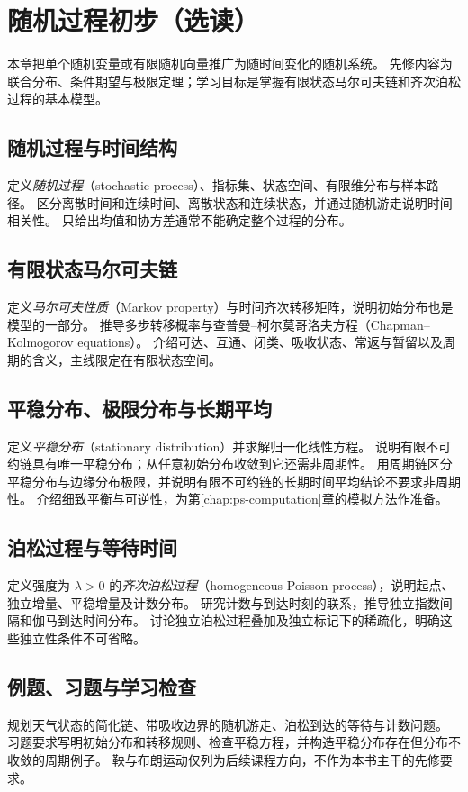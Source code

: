 \setcounter{chapter}{18} %
\chapter{随机过程初步（选读）}
\label{chap:ps-processes}

本章把单个随机变量或有限随机向量推广为随时间变化的随机系统。
先修内容为联合分布、条件期望与极限定理；学习目标是掌握有限状态马尔可夫链和齐次泊松过程的基本模型。

\section{随机过程与时间结构}
\label{sec:ps-process-language}
定义\emph{随机过程}（stochastic process）、指标集、状态空间、有限维分布与样本路径。
区分离散时间和连续时间、离散状态和连续状态，并通过随机游走说明时间相关性。
只给出均值和协方差通常不能确定整个过程的分布。

\section{有限状态马尔可夫链}
\label{sec:ps-markov-chains}
定义\emph{马尔可夫性质}（Markov property）与时间齐次转移矩阵，说明初始分布也是模型的一部分。
推导多步转移概率与查普曼--柯尔莫哥洛夫方程（Chapman--Kolmogorov equations）。
介绍可达、互通、闭类、吸收状态、常返与暂留以及周期的含义，主线限定在有限状态空间。

\section{平稳分布、极限分布与长期平均}
\label{sec:ps-stationarity}
定义\emph{平稳分布}（stationary distribution）并求解归一化线性方程。
说明有限不可约链具有唯一平稳分布；从任意初始分布收敛到它还需非周期性。
用周期链区分平稳分布与边缘分布极限，并说明有限不可约链的长期时间平均结论不要求非周期性。
介绍细致平衡与可逆性，为第\ref{chap:ps-computation}章的模拟方法作准备。

\section{泊松过程与等待时间}
\label{sec:ps-poisson-process}
定义强度为 $\lambda>0$ 的\emph{齐次泊松过程}（homogeneous Poisson process），说明起点、独立增量、平稳增量及计数分布。
研究计数与到达时刻的联系，推导独立指数间隔和伽马到达时间分布。
讨论独立泊松过程叠加及独立标记下的稀疏化，明确这些独立性条件不可省略。

\section{例题、习题与学习检查}
规划天气状态的简化链、带吸收边界的随机游走、泊松到达的等待与计数问题。
习题要求写明初始分布和转移规则、检查平稳方程，并构造平稳分布存在但分布不收敛的周期例子。
鞅与布朗运动仅列为后续课程方向，不作为本书主干的先修要求。






